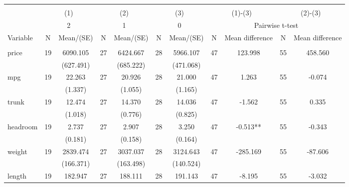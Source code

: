 
\begin{tabular}{@{\extracolsep{5pt}}lcccccccccc}
\\[-1.8ex]\hline \hline \\[-1.8ex]
 & \multicolumn{2}{c}{(1)}  & \multicolumn{2}{c}{(2)}  & \multicolumn{2}{c}{(3)}  & \multicolumn{2}{c}{(1)-(3)} & \multicolumn{2}{c}{(2)-(3)} \\
 & \multicolumn{2}{c}{2}  & \multicolumn{2}{c}{1}  & \multicolumn{2}{c}{0}  & \multicolumn{4}{c}{Pairwise t-test}  \\
Variable & N & Mean/(SE) & N & Mean/(SE) & N & Mean/(SE) & N & Mean difference & N & Mean difference \\ \hline \\[-1.8ex] 
price   & 19    & 6090.105    & 27    & 6424.667    & 28    & 5966.107    & 47    & 123.998    & 55    & 458.560   \\
 &   & (627.491)  &   & (685.222)  &   & (471.068)  &   &  &   &  \\ [1ex]
mpg   & 19    & 22.263    & 27    & 20.926    & 28    & 21.000    & 47    & 1.263    & 55    & -0.074   \\
 &   & (1.337)  &   & (1.055)  &   & (1.165)  &   &  &   &  \\ [1ex]
trunk   & 19    & 12.474    & 27    & 14.370    & 28    & 14.036    & 47    & -1.562    & 55    & 0.335   \\
 &   & (1.018)  &   & (0.776)  &   & (0.825)  &   &  &   &  \\ [1ex]
headroom   & 19    & 2.737    & 27    & 2.907    & 28    & 3.250    & 47    & -0.513**    & 55    & -0.343   \\
 &   & (0.181)  &   & (0.158)  &   & (0.164)  &   &  &   &  \\ [1ex]
weight   & 19    & 2839.474    & 27    & 3037.037    & 28    & 3124.643    & 47    & -285.169    & 55    & -87.606   \\
 &   & (166.371)  &   & (163.498)  &   & (140.524)  &   &  &   &  \\ [1ex]
length   & 19    & 182.947    & 27    & 188.111    & 28    & 191.143    & 47    & -8.195    & 55    & -3.032   \\

\end{tabular}
